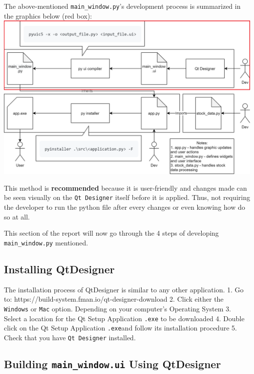 \documentclass[11pt]{article}
\begin{document}
The above-mentioned \texttt{main\_window.py}'s development process is
summarized in the graphics below (red box):
\includegraphics{../asset/img/main_window.py-process.png}

This method is \textbf{recommended} because it is user-friendly and
changes made can be seen visually on the \texttt{Qt\ Designer} itself
before it is applied. Thus, not requiring the developer to run the
python file after every changes or even knowing how do so at all.

This section of the report will now go through the 4 steps of developing
\texttt{main\_window.py} mentioned.

    \hypertarget{installing-qtdesigner}{%
\subsection{Installing QtDesigner}\label{installing-qtdesigner}}

    The installation process of QtDesigner is similar to any other
application. 1. Go to: https://build-system.fman.io/qt-designer-download
2. Click either the \texttt{Windows} or \texttt{Mac} option. Depending
on your computer's Operating System 3. Select a location for the Qt
Setup Application \texttt{.exe} to be downloaded 4. Double click on the
Qt Setup Application \texttt{.exe}and follow its installation procedure
5. Check that you have \texttt{Qt\ Designer} installed.

    \hypertarget{building-main_window.ui-using-qtdesigner}{%
\subsection{\texorpdfstring{Building \texttt{main\_window.ui} Using
QtDesigner}{Building main\_window.ui Using QtDesigner}}\label{building-main_window.ui-using-qtdesigner}}
\end{document}
